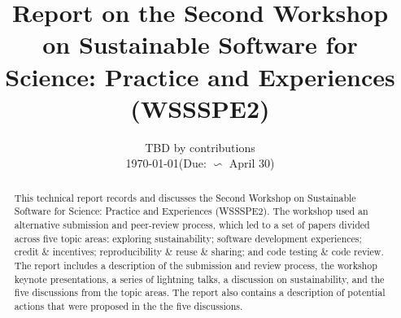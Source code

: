 \documentclass[11pt, oneside]{amsart}
\begin{document}
\title[]{Report on the Second Workshop on Sustainable Software for Science: Practice and Experiences (WSSSPE2)} 

\author{TBD by contributions \\{\scriptsize\today \quad  (Due:  $\backsim$ April 30)}} 
%
%
%
%  
%
%
%
%
%
%
%
 
       
\begin{abstract}      
This technical report records and discusses the Second Workshop on Sustainable
Software for Science: Practice and Experiences (WSSSPE2). The workshop used an
alternative submission and peer-review process, which led to a set of papers
divided across five topic areas: exploring sustainability; software development
experiences; credit \& incentives; reproducibility \& reuse \& sharing; and code
testing \& code review. The report includes a description of the submission and
review process, the workshop keynote presentations, a series of lightning talks, a discussion on
sustainability, and the five discussions from the topic areas. The report also
contains a description of potential actions that were proposed in the the five
discussions.
\end{abstract}
\end{document}
